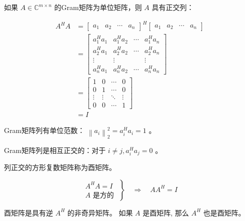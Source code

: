 \begin{definition}[复数域的Gram矩阵]
    如果 $ A \in \mathbb{C}^{m \times n} $ 的Gram矩阵为单位矩阵，则 $ A $ 具有正交列：

$$
\begin{aligned}
A^{H} A&=\left[\begin{array}{lllll}
a_{1} & a_{2} & \cdots & a_{n}
\end{array}\right]^{H}\left[\begin{array}{lccc}
a_{1} & a_{2} & \cdots & a_{n}
\end{array}\right] \\
&=\left[\begin{array}{cccc}
a_{1}^{H} a_{1} & a_{1}^{H} a_{2} & \cdots & a_{1}^{H} a_{n} \\
a_{2}^{H} a_{1} & a_{2}^{H} a_{2} & \cdots & a_{2}^{H} a_{n} \\
\vdots & \vdots & & \vdots \\
a_{n}^{H} a_{1} & a_{n}^{H} a_{2} & \cdots & a_{n}^{H} a_{n}
\end{array}\right] \\
&=\left[\begin{array}{cccc}
1 & 0 & \cdots & 0 \\
0 & 1 & \cdots & 0 \\
\vdots & \vdots & \ddots & \vdots \\
0 & 0 & \cdots & 1
\end{array}\right]
\\ &=I
\end{aligned}
$$
\end{definition}

Gram矩阵列有单位范数： $ \left\|a_{i}\right\|_{2}^{2}=a_{i}^{H} a_{i}=1 $ 。

Gram矩阵列是相互正交的：对于 $ i \neq j, a_{i}^{H} a_{j}=0 $ 。

\begin{definition}[酉矩阵]
    列正交的方形复数矩阵称为酉矩阵。
\end{definition}

\begin{definition}[酉矩阵的逆]
    $$ \left.\begin{array}{c}A^{H} A=I \\ A \text { 是方的 }\end{array}\right\} \quad \Rightarrow \quad A A^{H}=I $$
\end{definition}

酉矩阵是具有逆 $ A^{H} $ 的非奇异矩阵。 如果 $ A $ 是酉矩阵, 那么 $ A^{H} $ 也是酉矩阵。

